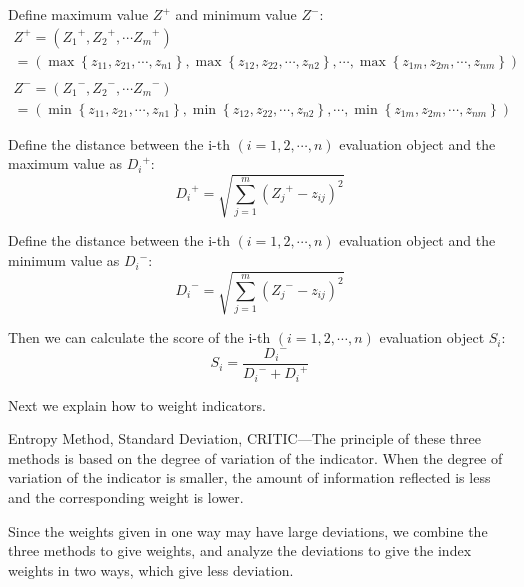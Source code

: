 \documentclass[12pt]{article}  %
\begin{document}
\begin{enumerate}[\bfseries 1.]
	Define maximum value ${Z^ + }$ and minimum value ${Z^ -}$:
	\begin{equation}
		\begin{array}{l}
			{Z^ + } = \left( {{Z_1}^ + ,{Z_2}^ + , \cdots {Z_m}^ + } \right)\\
			= \left( {\max \left\{ {{z_{11}},{z_{21}}, \cdots ,{z_{n1}}} \right\},\max \left\{ {{z_{12}},{z_{22}}, \cdots ,{z_{n2}}} \right\}, \cdots ,\max \left\{ {{z_{1m}},{z_{2m}}, \cdots ,{z_{nm}}} \right\}} \right)\\
			\\
			{Z^ - } = \left( {{Z_1}^ - ,{Z_2}^ - , \cdots {Z_m}^ - } \right)\\
			= \left( {\min \left\{ {{z_{11}},{z_{21}}, \cdots ,{z_{n1}}} \right\},\min \left\{ {{z_{12}},{z_{22}}, \cdots ,{z_{n2}}} \right\}, \cdots ,\min \left\{ {{z_{1m}},{z_{2m}}, \cdots ,{z_{nm}}} \right\}} \right)
		\end{array}
	\end{equation}
	
	Define the distance between the i-th $\left( {i = 1,2, \cdots ,n} \right)$ evaluation object and the maximum value as ${D_i}^ + $:
	\begin{equation}
		{D_i}^ +  = \sqrt {\sum\limits_{j = 1}^m {{{\left( {{Z_j}^ +  - {z_{ij}}} \right)}^2}} }
	\end{equation}
	
	Define the distance between the i-th $\left( {i = 1,2, \cdots ,n} \right)$ evaluation object and the minimum value as ${D_i}^ - $:
	\begin{equation}
		{D_i}^ -  = \sqrt {\sum\limits_{j = 1}^m {{{\left( {{Z_j}^ -  - {z_{ij}}} \right)}^2}} }
	\end{equation}
	
	Then we can calculate the score of the i-th $\left( {i = 1,2, \cdots ,n} \right)$ evaluation object ${S_i}$:
	\begin{equation}
		{S_i} = \frac{{{D_i}^ - }}{{{D_i}^ -  + {D_i}^ + }}
	\end{equation}
\end{enumerate}

Next we explain how to weight indicators.

Entropy Method, Standard Deviation, CRITIC---The principle of these three methods is based on the degree of variation of the indicator. When the degree of variation of the indicator is smaller, the amount of information reflected is less and the corresponding weight is lower. 

Since the weights given in one way may have large deviations, we combine the three methods to give weights, and analyze the deviations to give the index weights in two ways, which give less deviation.
\end{document}
